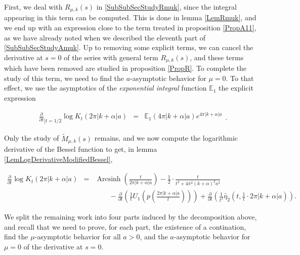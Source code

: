 \documentclass{jams-l}
\theoremstyle{definition}
\theoremstyle{remark}
\numberwithin{equation}{section}
\DeclareMathOperator{\arcsinh}{Arcsinh}
\begin{document}
            \noindent First, we deal with $R_{\mu,k} \left( s \right)$ in \ref{SubSubSecStudyRmuk}, since the integral appearing in this term can be computed. This is done in lemma \ref{LemRmuk}, and we end up with an expression close to the term treated in proposition \ref{PropA11}, as we have already noted when we described the eleventh part of \ref{SubSubSecStudyAmuk}. Up to removing some explicit terms, we can cancel the derivative at $s=0$ of the series with general term $R_{\mu,k} \left( s \right)$, and these terms which have been removed are studied in proposition \ref{PropR}. To complete the study of this term, we need to find the $a$-asymptotic behavior for $\mu = 0$. To that effect, we use the asymptotics of the \textit{exponential integral} function $\mathbb{E}_1$ the explicit expression
            
            \[ \begin{array}{lll}
                    \frac{\partial}{\partial t}_{\left \vert t = 1/2 \right.} \log K_t \left( 2 \pi \left \vert k + \alpha \right \vert a \right) & = & \mathbb{E}_1 \left( 4 \pi \left \vert k + \alpha \right \vert a \right) e^{4 \pi \left \vert k + \alpha \right \vert a}
                \end{array} . \]
            
            \noindent Only the study of $\widetilde{M}_{\mu,k} \left( s \right)$ remains, and we now compute the logarithmic derivative of the Bessel function to get, in lemma \ref{LemLogDerivativeModifiedBessel},
            
            \[ \begin{array}{lll}
                    \scriptstyle \frac{\partial}{\partial t} \log K_t \left( 2 \pi \left \vert k + \alpha \right \vert a \right) & \scriptstyle = & \scriptstyle \arcsinh \left( \frac{t}{2 \pi \left \vert k + \alpha \right \vert a} \right) - \frac{1}{2} \cdot \frac{t}{t^2 + 4 \pi^2 \left( k + \alpha \right)^2 a^2} \\[1em]
                        
                    && \qquad \scriptstyle - \frac{\partial}{\partial t} \left( \frac{1}{t} U_1 \left( p \left( \frac{2 \pi \left \vert k + \alpha \right \vert a}{t} \right) \right) \right) + \frac{\partial}{\partial t} \left( \frac{1}{t^2} \widetilde{\eta_2} \left( t, \frac{1}{t} \cdot 2 \pi \left \vert k + \alpha \right \vert a \right) \right).
                \end{array} \]
            
            \noindent We split the remaining work into four parts induced by the decomposition above, and recall that we need to prove, for each part, the existence of a contination, find the $\mu$-asymptotic behavior for all $a > 0$, and the $a$-asymptotic behavior for $\mu = 0$ of the derivative at $s=0$.
            
\end{document}
